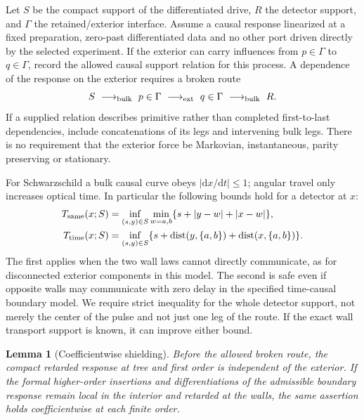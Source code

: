 \documentclass[11pt]{article}
\newtheorem{lemma}[theorem]{Lemma}
\newcommand{\dd}{\mathrm d}
\begin{document}
Let $S$ be the compact support of the differentiated drive, $R$ the detector support, and $\Gamma$ the retained/exterior interface. Assume a causal response linearized at a fixed preparation, zero-past differentiated data and no other port driven directly by the selected experiment. If the exterior can carry influences from $p\in\Gamma$ to $q\in\Gamma$, record the allowed causal support relation for this process. A dependence of the response on the exterior requires a broken route
\[
 S\ \longrightarrow_{\rm bulk}\ p\in\Gamma\
   \longrightarrow_{\rm ext}\ q\in\Gamma\
   \longrightarrow_{\rm bulk}\ R .
\]
If a supplied relation describes primitive rather than completed first-to-last dependencies, include concatenations of its legs and intervening bulk legs. There is no requirement that the exterior force be Markovian, instantaneous, parity preserving or stationary.

For Schwarzschild a bulk causal curve obeys $|\dd x/\dd t|\le1$; angular travel only increases optical time. In particular the following bounds hold for a detector at $x$:
\begin{align}
 T_{\rm same}(x;S)&=\inf_{(s,y)\in S}\min_{w=a,b}\{s+|y-w|+|x-w|\},\label{eq:delay1}\\
 T_{\rm time}(x;S)&=\inf_{(s,y)\in S}\{s+\operatorname{dist}(y,\{a,b\})
                                 +\operatorname{dist}(x,\{a,b\})\}.\label{eq:delay2}
\end{align}
The first applies when the two wall laws cannot directly communicate, as for disconnected exterior components in this model. The second is safe even if opposite walls may communicate with zero delay in the specified time-causal boundary model. We require strict inequality for the whole detector support, not merely the center of the pulse and not just one leg of the route. If the exact wall transport support is known, it can improve either bound.

\begin{lemma}[Coefficientwise shielding]\label{lem:shield}
Before the allowed broken route, the compact retarded response at tree and first order is independent of the exterior. If the formal higher-order insertions and differentiations of the admissible boundary response remain local in the interior and retarded at the walls, the same assertion holds coefficientwise at each finite order.
\end{lemma}
\end{document}
